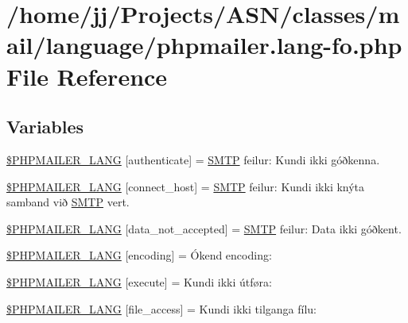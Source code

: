 \hypertarget{phpmailer_8lang-fo_8php}{}\section{/home/jj/\+Projects/\+A\+S\+N/classes/mail/language/phpmailer.lang-\/fo.php File Reference}
\label{phpmailer_8lang-fo_8php}
\subsection*{Variables}
\begin{DoxyCompactItemize}
\item 
\hyperlink{phpmailer_8lang-fo_8php_a2cb33073c989b85580748e331ed8b4aa}{\$\+P\+H\+P\+M\+A\+I\+L\+E\+R\+\_\+\+L\+A\+NG} \mbox{[}\textquotesingle{}authenticate\textquotesingle{}\mbox{]} = \textquotesingle{}\hyperlink{class_s_m_t_p}{S\+M\+TP} feilur\+: Kundi ikki góðkenna.\textquotesingle{}
\item 
\hyperlink{phpmailer_8lang-fo_8php_a2ee0cc637a06b96e45600db31c6799ee}{\$\+P\+H\+P\+M\+A\+I\+L\+E\+R\+\_\+\+L\+A\+NG} \mbox{[}\textquotesingle{}connect\+\_\+host\textquotesingle{}\mbox{]} = \textquotesingle{}\hyperlink{class_s_m_t_p}{S\+M\+TP} feilur\+: Kundi ikki knýta samband við \hyperlink{class_s_m_t_p}{S\+M\+TP} vert.\textquotesingle{}
\item 
\hyperlink{phpmailer_8lang-fo_8php_a814c6b191205d2361b3233e9c9d6fda5}{\$\+P\+H\+P\+M\+A\+I\+L\+E\+R\+\_\+\+L\+A\+NG} \mbox{[}\textquotesingle{}data\+\_\+not\+\_\+accepted\textquotesingle{}\mbox{]} = \textquotesingle{}\hyperlink{class_s_m_t_p}{S\+M\+TP} feilur\+: Data ikki góðkent.\textquotesingle{}
\item 
\hyperlink{phpmailer_8lang-fo_8php_a817f7283f3d54c970a0c10305cc668cc}{\$\+P\+H\+P\+M\+A\+I\+L\+E\+R\+\_\+\+L\+A\+NG} \mbox{[}\textquotesingle{}encoding\textquotesingle{}\mbox{]} = \textquotesingle{}Ókend encoding\+: \textquotesingle{}
\item 
\hyperlink{phpmailer_8lang-fo_8php_a668217a9563a168f30f2a8548b6ed5a9}{\$\+P\+H\+P\+M\+A\+I\+L\+E\+R\+\_\+\+L\+A\+NG} \mbox{[}\textquotesingle{}execute\textquotesingle{}\mbox{]} = \textquotesingle{}Kundi ikki útføra\+: \textquotesingle{}
\item 
\hyperlink{phpmailer_8lang-fo_8php_a7e83349023b856ef9e5c46e30ae6d51e}{\$\+P\+H\+P\+M\+A\+I\+L\+E\+R\+\_\+\+L\+A\+NG} \mbox{[}\textquotesingle{}file\+\_\+access\textquotesingle{}\mbox{]} = \textquotesingle{}Kundi ikki tilganga fílu\+: \textquotesingle{}

\end{DoxyCompactItemize}
